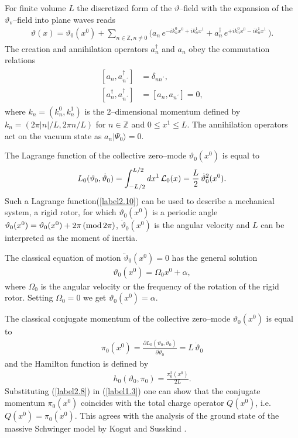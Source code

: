 \documentclass[a4paper,12pt] {article}
\begin{document}
For finite volume $L$ the discretized form of the $\vartheta$--field
with the expansion of the $\vartheta_{\mathrm v}$--field into plane
waves reads
%
\begin{eqnarray}\label{label2.8}
\vartheta(x) = \vartheta_0(x^0) + \sum_{n \in \mathbb{Z}, n \neq
0}\Big(a_n\,e^{\textstyle -ik^0_nx^0 + ik^1_nx^1} +
a^{\dagger}_n\,e^{\textstyle +ik^0_nx^0 - ik^1_nx^1}\,\Big).
\end{eqnarray}
%
The creation and annihilation operators $a^{\dagger}_n$ and $a_n$ obey
the commutation relations
%
\begin{eqnarray}\label{label2.9}
\begin{aligned}
{[a_n,a^{\dagger}_{n^{\,'}}]} &= \delta_{n n^{\,'}},\\
{[a^{\dagger}_n,a^{\dagger}_{n^{\,'}}]} &= {[a_n,a_{n^{\,'}}]} = 0,
\end{aligned}
\end{eqnarray}
%
where $k_n = (k^0_n,k^1_n)$ is the 2--dimensional momentum defined by
$k_n = (2\pi|n|/L, 2\pi n /L)$ for $n \in \mathbb{Z}$ and $0 \le
x^1 \le L$. The annihilation operators act on the vacuum state as
$a_n|\Psi_0\rangle = 0$.

The Lagrange function of the collective zero--mode $\vartheta_0(x^0)$
is equal to
%
\begin{eqnarray}\label{label2.10}
L_0(\vartheta_0,\dot{\vartheta}_0) = \int^{L/2}_{-L/2}dx^1\,{\cal
L}_0(x) =\frac{L}{2}\,\dot{\vartheta}^2_0(x^0).
\end{eqnarray}
%
Such a Lagrange function(\ref{label2.10}) can be used to describe a
mechanical system, a rigid rotor, for which $\vartheta_0(x^0)$ is a
periodic angle $\vartheta_0(x^0) = \vartheta_0(x^0) + 2\pi\,({\rm
  mod}\,2\pi)$, $\dot{\vartheta}_0(x^0)$ is the angular velocity and
$L$ can be interpreted as the moment of inertia.

The classical equation of motion $\ddot{\vartheta}_0(x^0) = 0$ has the
general solution
%
\begin{eqnarray}\label{label2.11}
\vartheta_0(x^0) = \Omega_0 x^0 + \alpha,
\end{eqnarray}
%
where $\Omega_0$ is the angular velocity or the frequency of the
rotation of the rigid rotor.  Setting $\Omega_0 = 0$ we get
$\vartheta_0(x^0) = \alpha$.

The classical conjugate momentum of the collective zero--mode
$\vartheta_0(x^0)$ is equal to
%
\begin{eqnarray}\label{label2.12}
\pi_0(x^0) = \frac{\partial L_0(\vartheta_0, \dot{\vartheta}_0)}{\partial
\dot{\vartheta}_0} = L\,\dot{\vartheta}_0
\end{eqnarray}
and the Hamilton function is defined by
%
\begin{eqnarray}\label{label2.13}
h_0(\vartheta_0,\pi_0) = \frac{\pi^2_0(x^0)}{2 L}.
\end{eqnarray}
%
Substituting (\ref{label2.8}) in (\ref{label1.3}) one can show that
the conjugate momentum $\pi_0(x^0)$ coincides with the total charge
operator $Q(x^0)$, i.e. $Q(x^0) = \pi_0(x^0)$. This agrees with the
analysis of the ground state of the massive Schwinger model by Kogut
and Susskind \cite{KS75}. 
\end{document}
